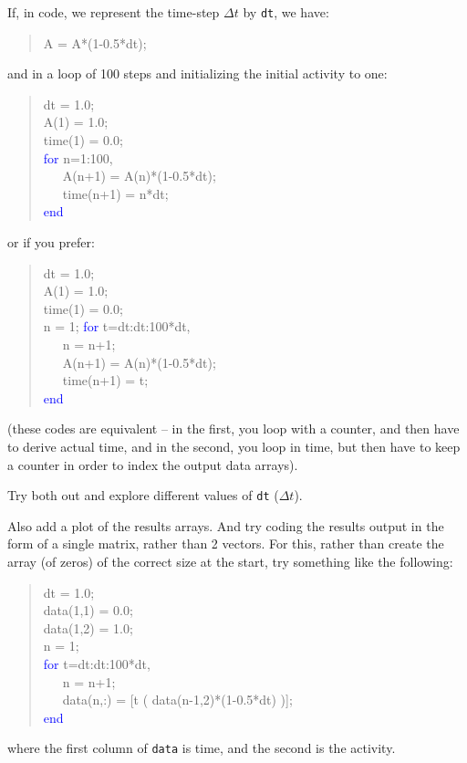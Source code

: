 \documentclass{tufte-book} %
\newenvironment{docspec}{\begin{quotation}\ttfamily\parskip0pt\parindent0pt\ignorespaces}{\end{quotation}}
\begin{document}
If, in code, we represent the time-step \(\Delta t\) by \texttt{dt}, we have:
\begin{docspec}
A = A*(1-0.5*dt);
\end{docspec}
and in a loop of 100 steps and initializing the initial activity to one:
\begin{docspec}
dt = 1.0;\\
A(1) = 1.0;\\
time(1) = 0.0;\\
\textcolor{blue}{for} n=1:100,\\
\ \ \ A(n+1) = A(n)*(1-0.5*dt);\\
\ \ \ time(n+1) = n*dt;\\
\textcolor{blue}{end}
\end{docspec}
or if you prefer:
\begin{docspec}
dt = 1.0;\\
A(1) = 1.0;\\
time(1) = 0.0;\\
n = 1;
\textcolor{blue}{for} t=dt:dt:100*dt,\\
\ \ \ n = n+1;\\
\ \ \ A(n+1) = A(n)*(1-0.5*dt);\\
\ \ \ time(n+1) = t;\\
\textcolor{blue}{end}
\end{docspec}
(these codes are equivalent -- in the first, you loop with a  counter, and then have to derive actual time, and in the second, you loop in time, but then have to keep a counter in order to index the output data arrays).

Try both out and explore different values of \texttt{dt} (\(\Delta t\)).

Also add a plot of the results arrays. And try coding the results output in the form of a single matrix, rather than 2 vectors. For this, rather than create the array (of zeros) of the correct size at the start, try something like the following:
\begin{docspec}
dt = 1.0;\\
data(1,1) = 0.0;\\
data(1,2) = 1.0;\\
n = 1;\\
\textcolor{blue}{for} t=dt:dt:100*dt,\\
\ \ \ n = n+1;\\
\ \ \ data(n,:) = [t ( data(n-1,2)*(1-0.5*dt) )];\\
\textcolor{blue}{end}
\end{docspec}
where the first column of \texttt{data} is time, and the second is the activity.
\end{document}
